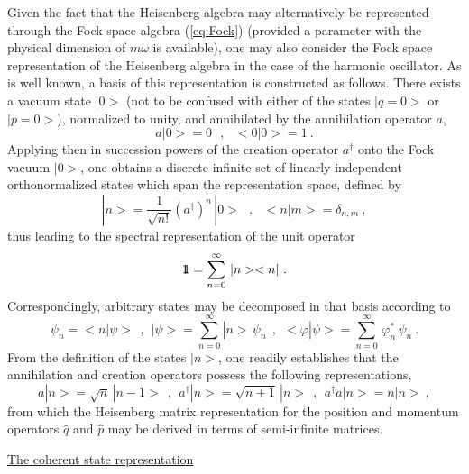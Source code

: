 \documentclass[a4paper,11pt]{article}
\def\one{1\hskip -.37em 1}
\begin{document}
Given the fact that the Heisenberg algebra may alternatively be
represented through the Fock space algebra (\ref{eq:Fock}) (provided
a parameter with the physical dimension of $m\omega$ is available),
one may also consider the Fock space representation of the Heisenberg
algebra in the case of the harmonic oscillator. As is well known, a basis 
of this representation is constructed
as follows. There exists a vacuum state $|0>$ (not to be confused with
either of the states $|q=0>$ or $|p=0>$), normalized to unity, and
annihilated by the annihilation operator $a$,
\begin{equation}
a|0>=0\ \ \ ,\ \ \ <0|0>=1\ .
\end{equation}
Applying then in succession powers of the creation operator $a^\dagger$
onto the Fock vacuum $|0>$,
one obtains a discrete infinite set of linearly independent orthonormalized
states which span the representation space, defined by
\begin{equation}
|n>=\frac{1}{\sqrt{n!}}\left(a^\dagger\right)^n\,|0>\ \ \ ,\ \ \ 
<n|m>=\delta_{n,m}\ ,
\end{equation}
thus leading to the spectral representation of the unit operator
\begin{equation}
\one=\sum_{n=0}^\infty\,|n><n|\ .
\end{equation}
Correspondingly, arbitrary states may be decomposed in that basis
according to
\begin{equation}
\psi_n=<n|\psi>\ \ ,\ \ 
|\psi>=\sum_{n=0}^\infty |n>\,\psi_n\ \ ,\ \ 
<\varphi|\psi>=\sum_{n=0}^\infty\,\varphi^*_n\,\psi_n\ .
\end{equation}
From the definition of the states $|n>$, one readily establishes that
the annihilation and creation operators possess the following
representations,
\begin{equation}
a|n>=\sqrt{n}\,|n-1>\ \ ,\ \ 
a^\dagger|n>=\sqrt{n+1}\,|n>\ \ ,\ \ 
a^\dagger a|n>=n|n>\ ,
\end{equation}
from which the Heisenberg matrix representation for the position and
momentum operators $\hat{q}$ and $\hat{p}$ may be derived in terms of
semi-infinite matrices.

\vspace{10pt}

\noindent\underline{The coherent state representation}

\vspace{5pt}
\end{document}
